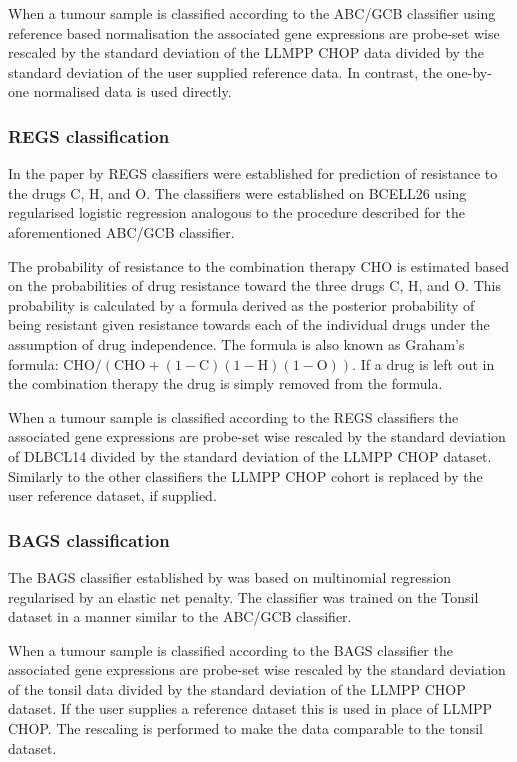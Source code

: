 \documentclass{article}
\begin{document}
When a tumour sample is classified according to the ABC/GCB classifier using reference based normalisation the associated gene expressions are probe-set wise rescaled by the standard deviation of the LLMPP CHOP data divided by the standard deviation of the user supplied reference data.
In contrast, the one-by-one normalised data is used directly.

\subsubsection{REGS classification}
In the paper by \citet{Falgreen2015} REGS classifiers were established for prediction of resistance to the drugs C, H, and O.
The classifiers were established on BCELL26 using regularised logistic regression analogous to the procedure described for the aforementioned ABC/GCB classifier.

The probability of resistance to the combination therapy CHO is estimated based on the probabilities of drug resistance toward the three drugs C, H, and O.
This probability is calculated by a formula derived as the posterior probability of being resistant given resistance towards each of the individual drugs under the assumption of drug independence.
The formula is also known as Graham's formula: $\mbox{CHO}/(\mbox{CHO}+(1-\mbox{C})(1-\mbox{H})(1-\mbox{O}))$.
If a drug is left out in the combination therapy the drug is simply removed from the formula.

When a tumour sample is classified according to the REGS classifiers the associated gene expressions are probe-set wise rescaled by the standard deviation of DLBCL14 divided by the standard deviation of the LLMPP CHOP dataset.
Similarly to the other classifiers the LLMPP CHOP cohort is replaced by the user reference dataset, if supplied.


\subsubsection{BAGS classification}
The BAGS classifier established by \citet{DybkaerBoegsted2015} was based on multinomial regression regularised by an elastic net penalty.
The classifier was trained on the Tonsil dataset in a manner similar to the ABC/GCB classifier.

When a tumour sample is classified according to the BAGS classifier the associated gene expressions are probe-set wise rescaled by the standard deviation of the tonsil data divided by the standard deviation of the LLMPP CHOP dataset.
If the user supplies a reference dataset this is used in place of LLMPP CHOP.
The rescaling is performed to make the data comparable to the tonsil dataset.
\end{document}

